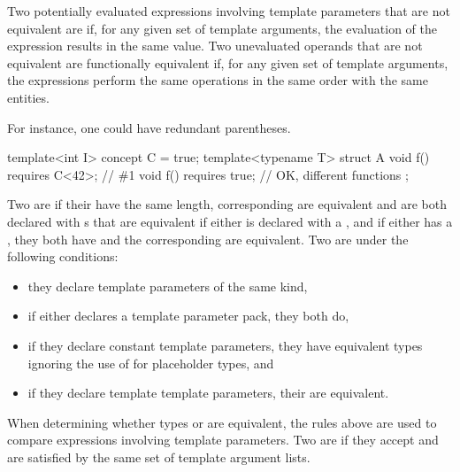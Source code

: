 %
Two potentially evaluated expressions involving template parameters that are not equivalent are
if, for any given set of template arguments, the evaluation of the
expression results in the same value.
Two unevaluated operands that are not equivalent
are functionally equivalent if, for any given set of template arguments,
the expressions perform
the same operations in the same order with the same entities.
\begin{note}
For instance, one could have redundant parentheses.
\end{note}
\begin{example}
\begin{codeblock}
template<int I> concept C = true;
template<typename T> struct A {
  void f() requires C<42>;      // \#1
  void f() requires true;       // OK, different functions
};
\end{codeblock}
\end{example}

\pnum
Two  are
 if
their  have the same length,
corresponding  are equivalent
and are both declared with s that are equivalent
if either 
is declared with a ,
and if either  has a ,
they both have
 and the corresponding
 are equivalent.
Two  are
under the following conditions:
\begin{itemize}
\item they declare template parameters of the same kind,
\item if either declares a template parameter pack, they both do,
\item if they declare constant template parameters,
they have equivalent types
ignoring the use of  for placeholder types, and
\item if they declare template template parameters,
their  are equivalent.
\end{itemize}
When determining whether types or 
are equivalent, the rules above are used to compare expressions
involving template parameters.
Two  are
if they accept and are satisfied by
the same set of template argument lists.

